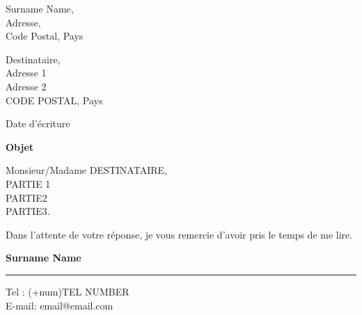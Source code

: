 \documentclass[11pt]{article}
\newcommand\signature[2]{%
    \raggedleft
\noindent\begin{minipage}{7cm}
    \noindent\vspace{1cm}\par
    \noindent\textbf{#1}\par
    \noindent\rule{6cm}{1pt}\par
    \noindent\vspace{1pt}\par
    \noindent#2%
\end{minipage}}
\begin{document}
\setlength{\columnsep}{0.3in}
\setcolumnwidth{3.1in, 1.07in}

\begin{paracol}{2}
    \noindent Surname Name,\\
    Adresse,\\
    Code Postal, Pays
    
    \switchcolumn
    
    
    
   
    
    \vspace*{1.5cm}
    
    \noindent
    Destinataire,\\
    Adresse 1\\
    Adresse 2\\
    CODE POSTAL, Pays

    
\end{paracol}

\vspace{1cm}

    {
        \hfill Date d'écriture
    }
    \\
    {
        \large
        \textbf{Objet}
        
        \vspace{0.5cm}
        
    }
    
    \noindent\par
    
    Monsieur/Madame DESTINATAIRE, \\
    
    PARTIE 1\\
    
    PARTIE2\\

    
    PARTIE3.
    
    \noindent\vspace{0.5cm}\par
    
    
    Dans l'attente de votre réponse, je vous remercie d'avoir pris le temps de me lire. \\
    \signature{Surname Name}{Tel : (+num)TEL NUMBER \\ E-mail: email@email.com}
        


\fancyhf{}
\renewcommand{\headrulewidth}{0pt}
\end{document}
